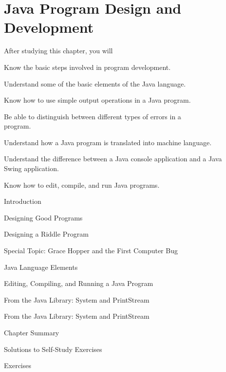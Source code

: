 

\setcounter{chapter}{0}
\setcounter{SSTUDYcount}{1}
\chapter{Java Program Design and Development}
\label{ch:intro2}

\CObegin
{}
\label{objectives}
\noindent After studying this chapter, you will

\begin{COBL}
\item  Know the basic steps involved in program
       development.
\item  Understand some of the basic elements of the Java language.
\item  Know how to use simple output operations in
       a Java program.
\item  Be able to distinguish between different types of errors in
       a \\program.
\item  Understand how a Java program is translated into
       machine language.
\item  Understand the difference between a Java console application
       and a Java \\Swing application.
\item  Know how to edit, compile, and run Java programs.
\end{COBL}


\label{outline}
\begin{COL}
\item Introduction
\item Designing Good Programs
\item Designing a Riddle Program
\item[] {{\color{cyan}Special Topic:} Grace Hopper and the First Computer Bug}
\item Java Language Elements
\item Editing, Compiling, and Running a Java Program
\item From the Java Library: System and PrintStream
\item From the Java Library: {System} and {PrintStream}
\par\small\item[] Chapter Summary
\par\small\item[] Solutions to Self-Study Exercises
\par\small\item[] Exercises
\end{COL}
\COend

